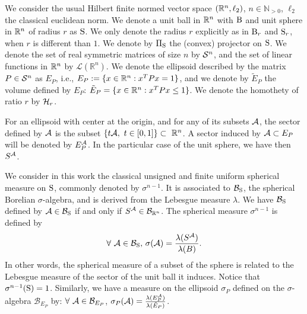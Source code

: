 We consider the usual Hilbert finite normed vector space $(\mathbb{R}^n,\ell_2)$, $n \in \mathbb{N}_{> 0}$, $\ell_2$ the classical euclidean norm. We denote a unit ball in $\mathbb{R}^n$ with $\text{B}$ and unit sphere in $\mathbb{R}^n$ of radius $r$ as $\text{S}$. We only denote the radius $r$ explicitly as in $\text{B}_r$ and $\text{S}_r$, when $r$ is different than $1$. We denote by $\Pi_{\text{S}}$ the (convex) projector on $\text{S}$. We denote the set of real symmetric matrices of size $n$ by $\mathcal{S}^n$, and the set of linear functions in $\mathbb{R}^n$ by $\mathcal{L}(\mathbb{R}^n)$. We denote the ellipsoid described by the matrix $P \in \mathcal{S}^n$ as $E_P$, i.e., $E_P:= \{x \in \mathbb{R}^n: x^TPx = 1\}$, and we denote by $\tilde{E}_P$ the volume defined by $E_P$: $\tilde{E}_P = \{x \in \mathbb{R}^n: x^TPx \leq 1\}$. We denote the homothety of ratio $r$ by $\mathcal{H}_{r}$. 


For an ellipsoid with center at the origin, and for any of its subsets $\mathcal{A}$, the sector defined by $\mathcal{A}$ is the subset $\{t \mathcal{A}, \ t \in [0,1]\} \subset\ \mathbb{R}^n$. A sector induced by $\mathcal{A} \subset E_P$ will be denoted by $E_P^{\mathcal{A}}$. In the particular case of the unit sphere, we have then $S^{\mathcal{A}}$.

We consider in this work the classical unsigned and finite uniform spherical measure on $\text{S}$, commonly denoted by $\sigma^{n-1}$. It is associated to $\mathcal{B}_{\text{S}}$, the spherical Borelian $\sigma$-algebra, and is derived from the Lebesgue measure $\lambda$. We have $\mathcal{B}_{\text{S}}$ defined by $\mathcal{A} \in \mathcal{B}_{\text{S}}$ if and only if $S^{\mathcal{A}} \in \mathcal{B}_{\mathbb{R}^n}$. The spherical measure $\sigma^{n-1}$ is defined by
$$\forall\ \mathcal{A} \in \mathcal{B}_{\text{S}},\, \sigma(\mathcal{A}) = \frac{\lambda(S^{\mathcal{A}})}{\lambda(B)}. $$
In other words, the spherical measure of a subset of the sphere is related to the Lebesgue measure of the sector of the unit ball it induces. Notice that $\sigma^{n-1}(\text{S}) = 1$.
Similarly, we have a measure on the ellipsoid $\sigma_P$ defined on the $\sigma$-algebra $\mathcal{B}_{E_P}$ by: $\forall\ \mathcal{A} \in \mathcal{B}_{E_P}$, $\sigma_P(\mathcal{A}) = \frac{\lambda(E_P^{\mathcal{A}})}{\lambda(\tilde{E}_P)}$.

